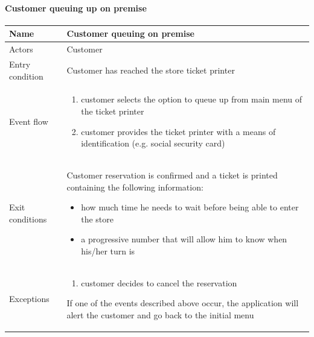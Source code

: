 \paragraph{Customer queuing up on premise}
\begin{flushleft}
	\begin{tabular} { | m{3cm} | m{10cm} | }
		\hline
		Name & Customer queuing on premise\\
		\hline
		Actors & Customer\\
		\hline
		Entry condition & Customer has reached the store ticket printer\\
		\hline
		Event flow & \begin{enumerate}
			\item customer selects the option to queue up from main menu of the ticket printer
			\item customer provides the ticket printer with a means of identification (e.g. social security card)
		\end{enumerate}\\
		\hline
		Exit conditions & Customer reservation is confirmed and a ticket is printed containing the following information:
		\begin{itemize}
			\item how much time he needs to wait before being able to enter the store
			\item a progressive number that will allow him to know when his/her turn is
		\end{itemize}\\
		\hline
		Exceptions & \begin{enumerate}
			\item customer decides to cancel the reservation
		\end{enumerate}
		If one of the events described above occur, the application will alert the customer and go back to the initial menu\\
		\hline
	\end{tabular}
\end{flushleft}

